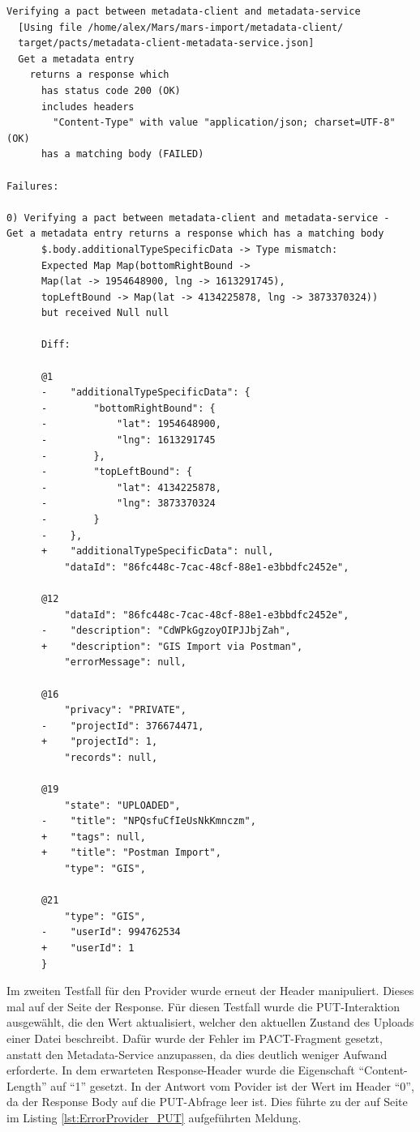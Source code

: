 \documentclass{llncs}
\begin{document}
\lstset{language = Java}
\begin{lstlisting}[caption=Test,label={lst:ErrorProvider_GET}]
Verifying a pact between metadata-client and metadata-service
  [Using file /home/alex/Mars/mars-import/metadata-client/
  target/pacts/metadata-client-metadata-service.json]
  Get a metadata entry
    returns a response which
      has status code 200 (OK)
      includes headers
        "Content-Type" with value "application/json; charset=UTF-8" (OK)
      has a matching body (FAILED)

Failures:

0) Verifying a pact between metadata-client and metadata-service - 
Get a metadata entry returns a response which has a matching body
      $.body.additionalTypeSpecificData -> Type mismatch: 
      Expected Map Map(bottomRightBound -> 
      Map(lat -> 1954648900, lng -> 1613291745), 
      topLeftBound -> Map(lat -> 4134225878, lng -> 3873370324)) 
      but received Null null

      Diff:

      @1
      -    "additionalTypeSpecificData": {
      -        "bottomRightBound": {
      -            "lat": 1954648900,
      -            "lng": 1613291745
      -        },
      -        "topLeftBound": {
      -            "lat": 4134225878,
      -            "lng": 3873370324
      -        }
      -    },
      +    "additionalTypeSpecificData": null,
          "dataId": "86fc448c-7cac-48cf-88e1-e3bbdfc2452e",
      
      @12
          "dataId": "86fc448c-7cac-48cf-88e1-e3bbdfc2452e",
      -    "description": "CdWPkGgzoyOIPJJbjZah",
      +    "description": "GIS Import via Postman",
          "errorMessage": null,
      
      @16
          "privacy": "PRIVATE",
      -    "projectId": 376674471,
      +    "projectId": 1,
          "records": null,
      
      @19
          "state": "UPLOADED",
      -    "title": "NPQsfuCfIeUsNkKmnczm",
      +    "tags": null,
      +    "title": "Postman Import",
          "type": "GIS",
      
      @21
          "type": "GIS",
      -    "userId": 994762534
      +    "userId": 1
      }
\end{lstlisting}

Im zweiten Testfall für den Provider wurde erneut der Header manipuliert. Dieses mal auf der Seite der Response. Für diesen Testfall wurde die PUT-Interaktion ausgewählt, die den Wert aktualisiert, welcher den aktuellen Zustand des Uploads einer Datei beschreibt. Dafür wurde der Fehler im PACT-Fragment gesetzt, anstatt den Metadata-Service anzupassen, da dies deutlich weniger Aufwand erforderte. In dem erwarteten Response-Header wurde die Eigenschaft \enquote{Content-Length} auf \enquote{1} gesetzt. In der Antwort vom Povider ist der Wert im Header \enquote{0}, da der Response Body auf die PUT-Abfrage leer ist. Dies führte zu der auf Seite \pageref{lst:ErrorProvider_PUT} im Listing \ref{lst:ErrorProvider_PUT} aufgeführten Meldung.
\end{document}
